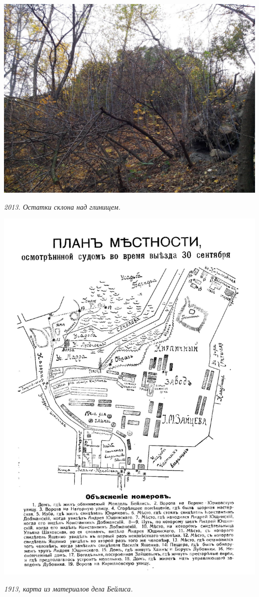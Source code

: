 \begin{center}
\includegraphics[width=\linewidth]{pix/s-IMG_20131020_163317.jpg}

\textit{2013. Остатки склона над глинищем.}
\end{center} 
\vspace*{\fill}
\newpage
\vspace*{\fill}
\begin{center}
\includegraphics[width=\linewidth]{pix/1913-karta.jpg}

\textit{1913, карта из материалов дела Бейлиса.}
\end{center} 
